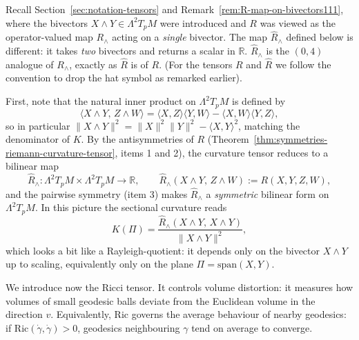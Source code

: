 \begin{colremark}{}
\label{rem:R-map-on-bivectors222}

Recall Section~\ref{sec:notation-tensors} and Remark~\ref{rem:R-map-on-bivectors111}, where the bivectors $X \wedge Y \in \Lambda^2 T_p M$ were introduced and $R$ was viewed as the operator-valued map $R_\wedge$ acting on a \emph{single} bivector. The map $\widehat R_\wedge$ defined below is different: it takes \emph{two} bivectors and returns a scalar in $\mathbb{R}$. $\widehat R_\wedge$ is the $(0,4)$ analogue of $R_\wedge$, exactly as $\widehat R$ is of $R$. (For the tensors $R$ and $\widehat R$ we follow the convention to drop the hat symbol as remarked earlier).

First, note that the natural inner product on $\Lambda^2 T_p M$ is defined by
\[
\langle X \wedge Y,\, Z \wedge W\rangle = \langle X, Z\rangle \langle Y, W\rangle - \langle X, W\rangle \langle Y, Z\rangle,
\]
so in particular $\|X \wedge Y\|^2 = \|X\|^2 \|Y\|^2 - \langle X, Y\rangle^2$, matching the denominator of $K$.
By the antisymmetries of $R$ (Theorem~\ref{thm:symmetries-riemann-curvature-tensor}, items 1 and 2), the curvature tensor reduces to a bilinear map
\[
\widehat R_\wedge : \Lambda^2 T_p M \times \Lambda^2 T_p M \to \mathbb{R}, \qquad \widehat R_\wedge(X \wedge Y,\, Z \wedge W) := R(X, Y, Z, W),
\]
and the pairwise symmetry (item 3) makes $\widehat R_\wedge$ a \emph{symmetric} bilinear form on $\Lambda^2 T_p M$. In this picture the sectional curvature reads
\[
K(\Pi) = \frac{\widehat R_\wedge(X \wedge Y,\, X \wedge Y)}{\|X \wedge Y\|^2},
\]
which looks a bit like a Rayleigh-quotient: it depends only on the bivector $X \wedge Y$ up to scaling, equivalently only on the plane $\Pi = \mathrm{span}(X, Y)$.
\end{colremark}






We introduce now the  Ricci tensor. It controls volume distortion: it measures how volumes of small geodesic balls deviate from the Euclidean volume in the direction $v$. Equivalently, $\mathrm{Ric}$ governs the average behaviour of nearby geodesics: if $\mathrm{Ric}(\dot\gamma, \dot\gamma) > 0$, geodesics neighbouring $\gamma$ tend on average to converge.

